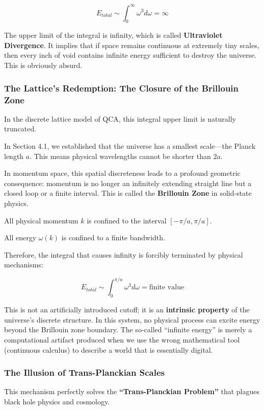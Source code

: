 \[E_{total} \sim \int_0^{\infty} \omega^3 d\omega = \infty\]

The upper limit of the integral is infinity, which is called \textbf{Ultraviolet Divergence}. It implies that if space remains continuous at extremely tiny scales, then every inch of void contains infinite energy sufficient to destroy the universe. This is obviously absurd.

\subsubsection{The Lattice's Redemption: The Closure of the Brillouin Zone}

In the discrete lattice model of QCA, this integral upper limit is naturally truncated.

In Section 4.1, we established that the universe has a smallest scale---the Planck length $a$. This means physical wavelengths cannot be shorter than $2a$.

In momentum space, this spatial discreteness leads to a profound geometric consequence: momentum is no longer an infinitely extending straight line but a closed loop or a finite interval. This is called the \textbf{Brillouin Zone} in solid-state physics.

All physical momentum $k$ is confined to the interval $[-\pi/a, \pi/a]$.

All energy $\omega(k)$ is confined to a finite bandwidth.

Therefore, the integral that causes infinity is forcibly terminated by physical mechanisms:

\[E_{total} \sim \int_0^{\pi/a} \omega^3 d\omega = \text{finite value}\]

This is not an artificially introduced cutoff; it is an \textbf{intrinsic property} of the universe's discrete structure. In this system, no physical process can excite energy beyond the Brillouin zone boundary. The so-called ``infinite energy'' is merely a computational artifact produced when we use the wrong mathematical tool (continuous calculus) to describe a world that is essentially digital.

\subsubsection{The Illusion of Trans-Planckian Scales}

This mechanism perfectly solves the \textbf{``Trans-Planckian Problem''} that plagues black hole physics and cosmology.

